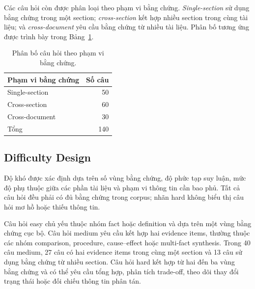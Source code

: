 Các câu hỏi còn được phân loại theo phạm vi bằng chứng. \textit{Single-section} sử dụng bằng chứng trong một section; \textit{cross-section} kết hợp nhiều section trong cùng tài liệu; và \textit{cross-document} yêu cầu bằng chứng từ nhiều tài liệu. Phân bố tương ứng được trình bày trong Bảng~\ref{tab:evidence-scope}.

\begin{table}[t]
\centering
\small
\begin{tabular}{lr}
\toprule
\textbf{Phạm vi bằng chứng} & \textbf{Số câu} \\
\midrule
Single-section & 50 \\
Cross-section  & 60 \\
Cross-document & 30 \\
\midrule
Tổng           & 140 \\
\bottomrule
\end{tabular}
\caption{Phân bố câu hỏi theo phạm vi bằng chứng.}
\label{tab:evidence-scope}
\end{table}

\subsection{Difficulty Design}

Độ khó được xác định dựa trên số vùng bằng chứng, độ phức tạp suy luận, mức độ phụ thuộc giữa các phần tài liệu và phạm vi thông tin cần bao phủ. Tất cả câu hỏi đều phải có đủ bằng chứng trong corpus; nhãn hard không biểu thị câu hỏi mơ hồ hoặc thiếu thông tin.

Câu hỏi easy chủ yếu thuộc nhóm fact hoặc definition và dựa trên một vùng bằng chứng cục bộ. Câu hỏi medium yêu cầu kết hợp hai evidence items, thường thuộc các nhóm comparison, procedure, cause--effect hoặc multi-fact synthesis. Trong 40 câu medium, 27 câu có hai evidence items trong cùng một section và 13 câu sử dụng bằng chứng từ nhiều section. Câu hỏi hard kết hợp từ hai đến ba vùng bằng chứng và có thể yêu cầu tổng hợp, phân tích trade-off, theo dõi thay đổi trạng thái hoặc đối chiếu thông tin phân tán.